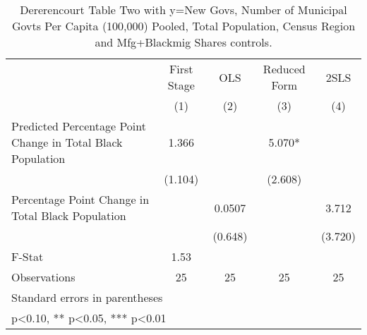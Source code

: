 \begin{table}[htbp]\centering
\def\sym#1{\ifmmode^{#1}\else\(^{#1}\)\fi}
\caption{Dererencourt Table Two with y=New Govs, Number of Municipal Govts Per Capita (100,000) Pooled, Total Population, Census Region and Mfg+Blackmig Shares controls.}
\begin{tabular}{l*{4}{c}}
\toprule
                    & First Stage   &         OLS   &Reduced Form   &        2SLS   \\
                    &\multicolumn{1}{c}{(1)}   &\multicolumn{1}{c}{(2)}   &\multicolumn{1}{c}{(3)}   &\multicolumn{1}{c}{(4)}   \\
\midrule
Predicted Percentage Point Change in Total Black Population&       1.366   &               &       5.070*  &               \\
                    &     (1.104)   &               &     (2.608)   &               \\
\addlinespace
Percentage Point Change in Total Black Population&               &      0.0507   &               &       3.712   \\
                    &               &     (0.648)   &               &     (3.720)   \\
\midrule
F-Stat              &        1.53   &               &               &               \\
Observations        &          25   &          25   &          25   &          25   \\
\bottomrule
\multicolumn{5}{l}{\footnotesize Standard errors in parentheses}\\
\multicolumn{5}{l}{\footnotesize * p<0.10, ** p<0.05, *** p<0.01}\\
\end{tabular}
\end{table}
